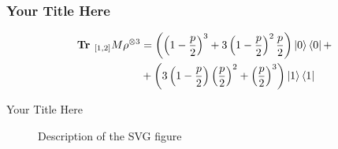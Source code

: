 \documentclass{beamer}
\begin{document}
\begin{frame}
  \frametitle{Your Title Here}  
  \begin{equation*}
    \begin{split}
      \textbf{Tr }_{[1,2]}M\rho^{\otimes 3} &= \left( \left( 1 - \frac{p}{2} \right)^3 + 3 \left( 1 - \frac{p}{2} \right)^{2} \frac{p}{2} \right) \ket{0}\bra{0} +  \\ 
      &+ \left( 3\left( 1 - \frac{p}{2} \right)\left( \frac{p}{2} \right)^2 + \left( \frac{p}{2} \right)^{3} \right) \ket{1}\bra{1}\\
    \end{split}
  \end{equation*}
\end{frame}


\begin{frame}{Your Title Here}
    \begin{figure}
        \centering
        
        \caption{Description of the SVG figure}
    \end{figure}
\end{frame}
\end{document}
